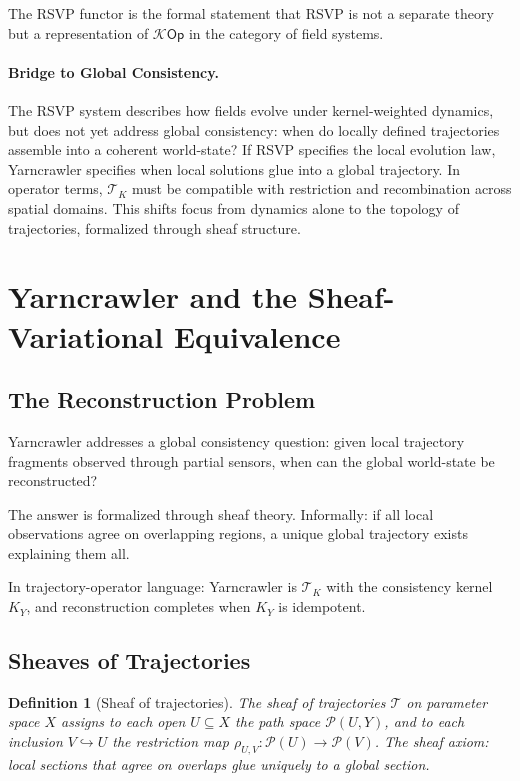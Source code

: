 \documentclass[12pt]{article}
\newtheorem{definition}[theorem]{Definition}
\newcommand{\Pcal}{\mathcal{P}}
\newcommand{\Kcal}{\mathcal{K}}
\newcommand{\TK}{\mathcal{T}_K}
\begin{document}
The RSVP functor is the formal statement that RSVP is not a separate
theory but a representation of $\Kcal\mathsf{Op}$ in the category of
field systems.

\paragraph{Bridge to Global Consistency.}
The RSVP system describes how fields evolve under kernel-weighted dynamics,
but does not yet address global consistency: when do locally defined
trajectories assemble into a coherent world-state? If RSVP specifies the
local evolution law, Yarncrawler specifies when local solutions glue into
a global trajectory. In operator terms, $\TK$ must be compatible with
restriction and recombination across spatial domains. This shifts focus
from dynamics alone to the topology of trajectories, formalized through
sheaf structure.

\section{Yarncrawler and the Sheaf-Variational Equivalence}
\label{sec:yarncrawler}

\subsection{The Reconstruction Problem}

Yarncrawler addresses a global consistency question: given local trajectory
fragments observed through partial sensors, when can the global world-state
be reconstructed?

The answer is formalized through sheaf theory. Informally: if all local
observations agree on overlapping regions, a unique global trajectory exists
explaining them all.

In trajectory-operator language: Yarncrawler is $\TK$ with the
consistency kernel $K_Y$, and reconstruction completes when $K_Y$ is
idempotent.

\subsection{Sheaves of Trajectories}

\begin{definition}[Sheaf of trajectories]
The \emph{sheaf of trajectories} $\mathscr{T}$ on parameter space $X$
assigns to each open $U \subseteq X$ the path space $\Pcal(U, Y)$,
and to each inclusion $V \hookrightarrow U$ the restriction map
$\rho_{U,V} \colon \Pcal(U) \to \Pcal(V)$.
The sheaf axiom: local sections that agree on overlaps glue uniquely to
a global section.
\end{definition}
\end{document}
